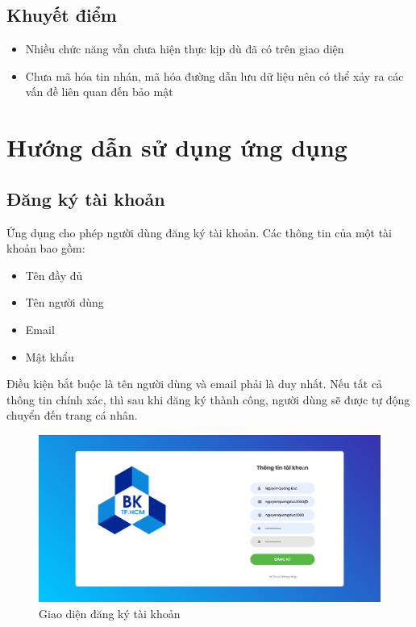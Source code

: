\documentclass[a4paper]{article}
\begin{document}
	\subsection{Khuyết điểm}
		\begin{itemize}
			\item Nhiều chức năng vẫn chưa hiện thực kịp dù đã có trên giao diện
			\item Chưa mã hóa tin nhán, mã hóa đường dẫn lưu dữ liệu nên có thể xảy ra các vấn đề liên quan đến bảo mật
		\end{itemize}
		
\section{Hướng dẫn sử dụng ứng dụng}
	\subsection{Đăng ký tài khoản}
	Ứng dụng cho phép người dùng đăng ký tài khoản. Các thông tin của một tài khoản bao gồm:\linebreak
	\begin{itemize}
		\item Tên đầy đủ
		\item Tên người dùng
		\item Email
		\item Mật khẩu
	\end{itemize}
	Điều kiện bắt buộc là tên người dùng và email phải là duy nhất.\linebreak
	Nếu tất cả thông tin chính xác, thì sau khi đăng ký thành công, người dùng sẽ được tự động chuyển đến trang cá nhân.
	
	\begin{figure}[H]
		\centering
		\includegraphics[scale=0.36]{create_user.png}
		\caption{Giao diện đăng ký tài khoản}
		\label{F:create_user}
	\end{figure}
	
\end{document}
